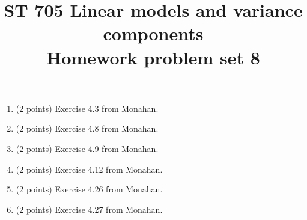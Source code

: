 \documentclass[11pt]{article}
\title{ST 705 Linear models and variance components \\ 
        Homework problem set 8}
\begin{document}
\maketitle

\begin{enumerate}

\item(2 points) Exercise 4.3 from Monahan.

\item(2 points) Exercise 4.8 from Monahan.

\item(2 points) Exercise 4.9 from Monahan.

\item(2 points) Exercise 4.12 from Monahan.

\item(2 points) Exercise 4.26 from Monahan.

\item(2 points) Exercise 4.27 from Monahan.

\end{enumerate}
\end{document}
